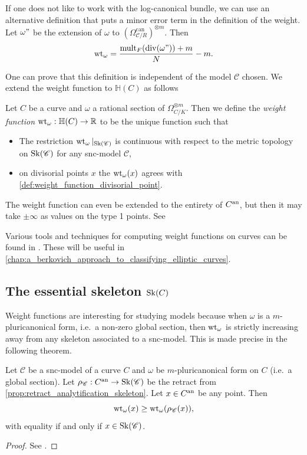 \begin{remark}
	If one does not like to work with the log-canonical bundle, we can use an alternative definition that puts a minor error term in the definition of the weight. 
	Let $\omega"$ be the extension of $\omega$ to $(\Omega_{\mathscr C / R}^{\text{can}})^{\otimes m}$. Then \[
		\operatorname{wt}_{\omega} = \frac{\operatorname{mult}_F(\operatorname{div} (\omega")) + m}{N} - m
	.\] 
\end{remark}
One can prove that this definition is independent of the model $\mathscr C$ chosen. 
We extend the weight function to $\mathbb{H}(C)$ as follows 
\begin{definition}\label{def:weight_function}
	Let $C$ be a curve and $\omega$ a rational section of $\Omega_{C / K}^{\otimes m}$. 
	Then we define the \emph{weight function} $\operatorname{wt}_{\omega}: \mathbb{H}(C) \to \mathbb{R}$ to be the unique function such that 
	\begin{itemize}
		\item The restriction $\operatorname{wt}_{\omega}|_{\operatorname{Sk}(\mathscr C)}$ is continuous with respect to the metric topology on $\operatorname{Sk}(\mathscr C)$ for any snc-model $\mathscr C$, 
		\item on divisorial points $x$ the $\operatorname{wt}_{\omega}(x)$ agrees with \cref{def:weight_function_divisorial_point}.
	\end{itemize}
\end{definition}

The weight function can even be extended to the entirety of $C{}^{\text{an}}$, but then it may take $\pm \infty$ as values on the type 1 points. See \cite[§4.5.4]{mustataWeightFunctionsNonArchimedean2015}


Various tools and techniques for computing weight functions on curves can be found in \cite{bakerWeightFunctionsBerkovich2016}. 
These will be useful in \cref{chap:a_berkovich_approach_to_classifying_elliptic_curves}. 

\subsection{The essential skeleton $\sk(C)$}\label{sec:the_essential_skeleton_sk_c$}

Weight functions are interesting for studying models because when $\omega$ is a $m$-pluricanonical form, i.e.\ a non-zero global section, then $\operatorname{wt}_\omega$ is strictly increasing away from any skeleton associated to a snc-model. 
This is made precise in the following theorem. 
\begin{proposition}\label{prop:weight_function_increase}
	Let $\mathscr C$ be a snc-model of a curve $C$ and $\omega$ be $m$-pluricanonical form on $C$ (i.e.\ a global section).
	Let $\rho_{\mathscr C}: C{}^{\text{an}} \to \operatorname{Sk}(\mathscr C)$ be the retract from \cref{prop:retract_analytification_skeleton}. 
	Let $x \in C{}^{\text{an}} $ be any point. 
	Then \[
		\operatorname{wt}_\omega(x) \ge \operatorname{wt}_\omega(\rho_{\mathscr C}(x))
	,\] 
	with equality if and only if $x \in \operatorname{Sk}(\mathscr C)$. 
\end{proposition}
\begin{proof}
	See \cite[prop.\ 4.4.4]{mustataWeightFunctionsNonArchimedean2015}. 
\end{proof}

